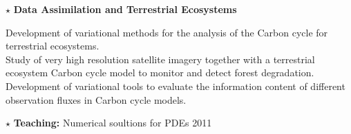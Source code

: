 \documentclass[11 pt,oneside,a4paper,titlepage]{article}
\begin{document}
{\begin{minipage}{12.3cm}
        $\star$ \textbf{Data Assimilation and Terrestrial Ecosystems}\\

        \vspace*{-0.2cm}
        \hspace*{0.2cm}
        \begin{minipage}{12cm}
            {\bullet} Development of variational methods for the analysis of the Carbon cycle for terrestrial ecosystems.\\
            {\bullet} Study of very high resolution satellite imagery together with a terrestrial ecosystem Carbon cycle model to monitor and detect forest degradation.\\
            {\bullet} Development of variational tools to evaluate the information content of different observation fluxes in Carbon cycle models. \\
        \end{minipage}

        $\star$ \textbf{Teaching:} Numerical soultions for PDEs \hfill 2011\\   
    \end{minipage}} %
\end{document}
